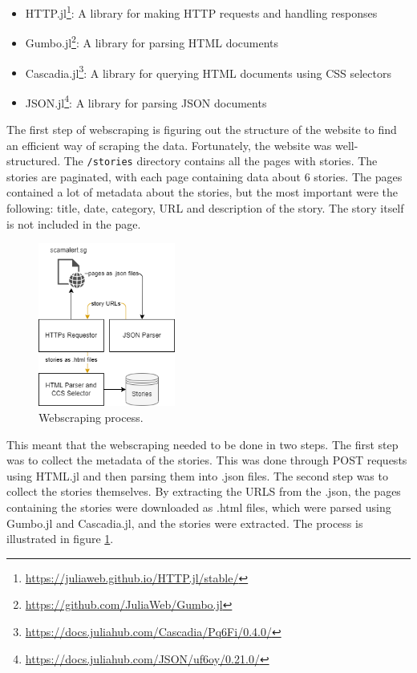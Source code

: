 \begin{itemize}
    \item HTTP.jl\footnote[0]{\url{https://juliaweb.github.io/HTTP.jl/stable/}}: A library for making HTTP requests and handling responses 
    \item Gumbo.jl\footnote[1]{\url{https://github.com/JuliaWeb/Gumbo.jl}}: A library for parsing HTML documents
    \item Cascadia.jl\footnote[2]{\url{https://docs.juliahub.com/Cascadia/Pq6Fi/0.4.0/}}: A library for querying HTML documents using CSS selectors
    \item JSON.jl\footnote[3]{\url{https://docs.juliahub.com/JSON/uf6oy/0.21.0/}}: A library for parsing JSON documents
\end{itemize}

The first step of webscraping is figuring out the structure of the website to find an efficient way of scraping the data. Fortunately, the website was well-structured. The \texttt{/stories} directory contains all the pages with stories. The stories are paginated, with each page containing data about 6 stories. The pages contained a lot of metadata about the stories, but the most important were the following: title, date, category, URL and description of the story. The story itself is not included in the page. 

\begin{figure}
    \centering
    \includegraphics[width=0.4\textwidth]{resources/webscraper.drawio.png}
    \caption{Webscraping process.}
    \label{fig:webscraping}
\end{figure}

This meant that the webscraping needed to be done in two steps. The first step was to collect the metadata of the stories. This was done through POST requests using HTML.jl and then parsing them into .json files. The second step was to collect the stories themselves. By extracting the URLS from the .json, the pages containing the stories were downloaded as .html files, which were parsed using Gumbo.jl and Cascadia.jl, and the stories were extracted. The process is illustrated in figure \ref{fig:webscraping}.

